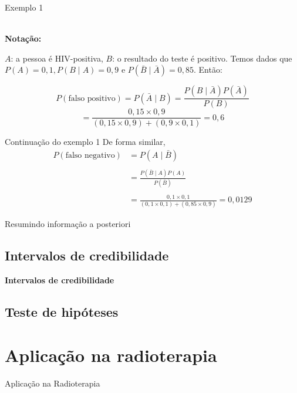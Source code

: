 \documentclass{beamer}
\theoremstyle{definition}
\begin{document}
\begin{frame}{Exemplo 1}

 \\

\textbf{Notação:}

$A$: a pessoa é HIV-positiva,
$B$: o resultado do teste é positivo.
Temos dados que $P(A)=0,1,P(B\mid A)=0,9$ e $P(\bar{B}\mid\bar{A})=0,85$. Então:

$$P(\text{falso positivo})=P(\bar{A} \mid B)=\frac{P(B \mid \bar{A}) P(\bar{A})}{P(B)}$$ 
$$=\frac{0,15 \times 0,9}{(0,15 \times 0,9)+(0,9 \times 0,1)}=0,6$$

\end{frame}

\begin{frame}{Continuação do exemplo 1}
De forma similar,
$$
\begin{aligned}
P(\text {falso negativo}) & =P(A \mid \bar{B}) \\ \\
& =\frac{P(\bar{B} \mid A) P(A)}{P(\bar{B})} \\ \\
& =\frac{0,1 \times 0,1}{(0,1 \times 0,1)+(0,85 \times 0,9)}=0,0129
\end{aligned}
$$
\end{frame}

\begin{frame}{Resumindo informação a posteriori}
\subsection{Intervalos de credibilidade}
\textbf{Intervalos de credibilidade}


\subsection{Teste de hipóteses}
    
\end{frame}

\section{Aplicação na radioterapia}

\begin{frame}{Aplicação na Radioterapia}
    
\end{frame}
 
\end{document}
